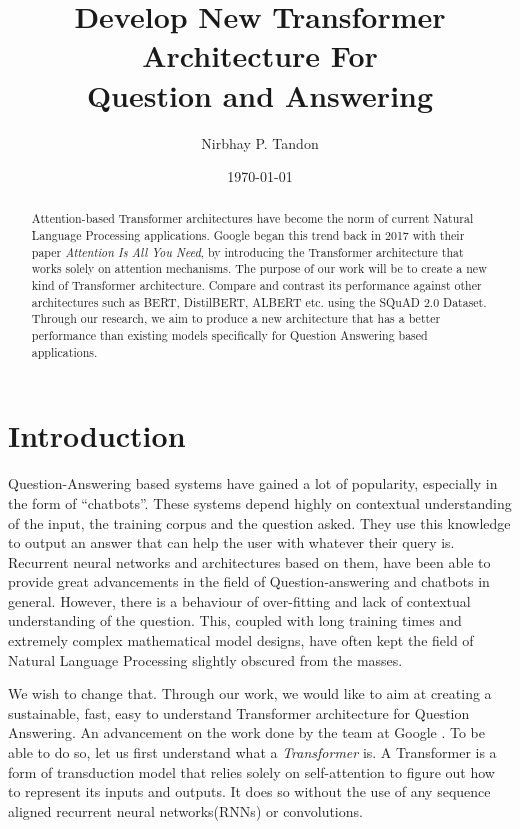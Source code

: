 \documentclass[12pt]{report}
\begin{document}
    \title{Develop New Transformer Architecture For \\ Question and Answering}

    \author{Nirbhay P. Tandon}

    \date{\vfill \monthyeardate\today}
    \maketitle


    \newpage
    \newpage
    \tableofcontents
    \newpage
    \listoffigures
    \listoftables
    
    \printnomenclature[1in]
	\begin{abstract}
		Attention-based Transformer architectures have become the norm of current Natural Language Processing applications. Google began this trend back in 2017 with their paper \textit{Attention Is All You Need}, by introducing the Transformer architecture that works solely on attention mechanisms. The purpose of our work will be to create a new kind of Transformer architecture. Compare and contrast its performance against other architectures such as BERT, DistilBERT, ALBERT etc. using the SQuAD 2.0 Dataset. Through our research, we aim to produce a new architecture that has a better performance than existing models specifically for Question Answering based applications.
	\end{abstract}

    \chapter{\centering Introduction}\label{c1}
    Question-Answering based systems have gained a lot of popularity, especially in the form of ``chatbots''. These systems depend highly on contextual understanding of the input, the training corpus and the question asked. They use this knowledge to output an answer that can help the user with whatever their query is. Recurrent neural networks and architectures based on them, have been able to provide great advancements in the field of Question-answering and chatbots in general. However, there is a behaviour of over-fitting and lack of contextual understanding of the question. This, coupled with long training times and extremely complex mathematical model designs, have often kept the field of Natural Language Processing slightly obscured from the masses.

    We wish to change that. Through our work, we would like to aim at creating a sustainable, fast, easy to understand Transformer architecture for Question Answering. An advancement on the work done by the team at Google \citep{atayl}. To be able to do so, let us first understand what a \textit{Transformer} is.
    A Transformer is a form of transduction model that relies solely on self-attention to figure out how to represent its inputs and outputs. It does so without the use of any sequence aligned recurrent neural networks(RNNs) or convolutions.
\end{document}
